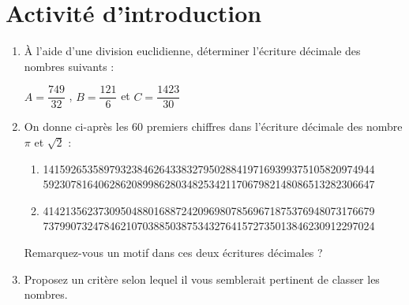 \documentclass[oneside,12pt]{article}          %
\begin{document}
\section*{Activité d'introduction}

\begin{enumerate}[itemsep = 5mm]
	\item À l'aide d'une division euclidienne, déterminer l'écriture décimale des nombres suivants : 
	
	$A = \dfrac{749}{32}$ \qquad , \qquad $B = \dfrac{121}{6}$ \qquad et \qquad $C = \dfrac{1423}{30}$
	
	
	\item On donne ci-après les $60$ premiers chiffres dans l'écriture décimale des nombre $\pi$ et $\sqrt{2}$ : \\
	\begin{enumerate}
		\item[$\pi = 3,$]
		141592653589793238462643383279502884197169399375105820974944 \\
		592307816406286208998628034825342117067982148086513282306647 \\
		
		\item[$\sqrt{2} = 1,$]
		414213562373095048801688724209698078569671875376948073176679 \\
		737990732478462107038850387534327641572735013846230912297024 
	\end{enumerate}

	Remarquez-vous un motif dans ces deux écritures décimales ?	
	
	\item Proposez un critère selon lequel il vous semblerait pertinent de classer les nombres.
\end{enumerate}
\end{document}
